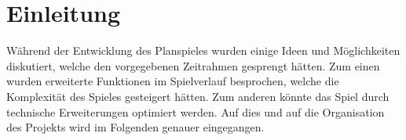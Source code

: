 \section{Einleitung}
\label{sec:fazit-einleitung}

Während der Entwicklung des Planspieles wurden einige Ideen und Möglichkeiten diskutiert, welche den vorgegebenen Zeitrahmen gesprengt hätten. Zum einen wurden erweiterte Funktionen im Spielverlauf besprochen, welche die Komplexität des Spieles gesteigert hätten. Zum anderen könnte das Spiel durch technische Erweiterungen optimiert werden. Auf dies und auf die Organisation des Projekts wird im Folgenden genauer eingegangen. 